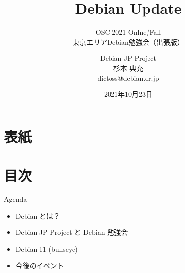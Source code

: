 \title{Debian Update}
\subtitle{OSC 2021 Onlne/Fall \\東京エリアDebian勉強会（出張版）}
\author{Debian JP Project \\杉本 典充\\ dictoss@debian.or.jp}
\date{2021年10月23日}




\section{表紙}

\begin{frame}
\titlepage{}
\end{frame}

\section{目次}

\begin{frame}{Agenda}
  \begin{itemize}
  \item Debian とは？
  \item Debian JP Project と Debian 勉強会
  \item Debian 11 (bullseye)
  \item 今後のイベント
  \end{itemize}
\end{frame}

